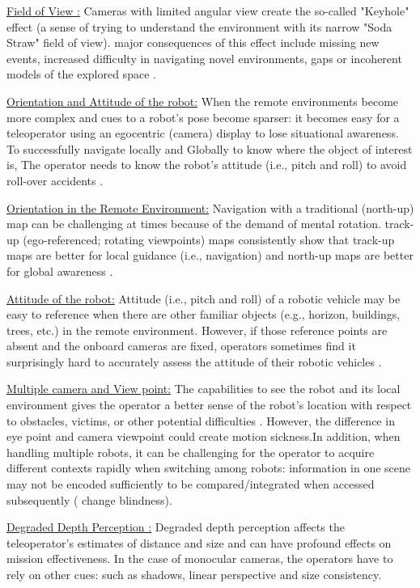 \underline {Field of View :} 
Cameras with limited angular view create the so-called "Keyhole" effect (a sense of trying to understand the environment with its narrow "Soda Straw" field of view). major consequences of this effect include missing new events, increased difficulty in navigating novel environments, gaps or incoherent models of the explored space \cite{woods2004envisioning}.

\underline {Orientation and Attitude of the robot:} 
When the remote environments become more complex and cues to a robot’s pose become sparser: it becomes easy for a teleoperator using an egocentric (camera) display to lose situational awareness. To successfully navigate locally and Globally to know where the object of interest is, The operator needs to know the robot's attitude (i.e., pitch and roll) to avoid roll-over accidents \cite{wang2004gravity}.

\underline{Orientation in the Remote Environment:} Navigation with a traditional (north-up) map can be challenging at times because of the demand of mental rotation. track-up (ego-referenced; rotating viewpoints) maps consistently show that track-up maps are better for local guidance (i.e., navigation) and north-up maps are better for global awareness \cite{wang2004gravity}.

\underline{Attitude of the robot:} Attitude (i.e., pitch and roll) of a robotic vehicle may be easy to reference when there are other familiar objects (e.g., horizon, buildings, trees, etc.) in the remote environment. However, if those reference points are absent and the onboard cameras are fixed, operators sometimes find it surprisingly hard to accurately assess the attitude of their robotic vehicles \cite{wang2004gravity}.

\underline{Multiple camera and View point:}
The capabilities to see the robot and its local environment gives the operator a better sense of the robot’s location with respect to obstacles, victims, or other potential difficulties \cite{keyes2006camera}. However, the difference in eye point and camera viewpoint could create motion sickness.In addition, when handling multiple robots, it can be challenging for the operator to acquire different contexts rapidly when switching among robots: information in one scene may not be encoded sufficiently to be compared/integrated when accessed subsequently ( change blindness).

\underline{Degraded Depth Perception :}
Degraded depth perception affects the teleoperator’s estimates of distance and size and can have profound effects on mission effectiveness. In the case of monocular cameras, the operators have to rely on other cues: such as shadows, linear perspective and size consistency.

